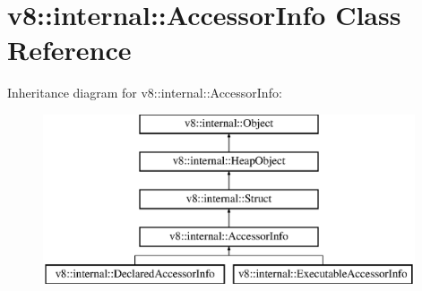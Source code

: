 \hypertarget{classv8_1_1internal_1_1_accessor_info}{}\section{v8\+:\+:internal\+:\+:Accessor\+Info Class Reference}
\label{classv8_1_1internal_1_1_accessor_info}
Inheritance diagram for v8\+:\+:internal\+:\+:Accessor\+Info\+:\begin{figure}[H]
\begin{center}
\leavevmode
\includegraphics[height=5.000000cm]{classv8_1_1internal_1_1_accessor_info}
\end{center}
\end{figure}
